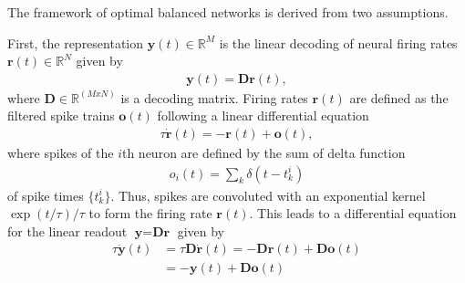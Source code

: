 \documentclass[twoside,twocolumn]{article}
\renewcommand{\b}[1]{\textbf{#1}}
\newcommand{\R}{\mathbb{R}}
\begin{document}
The framework of optimal balanced networks \cite{Deneve2016, Boerlin2013} is derived from two assumptions. 

First, the representation $\b{y}(t) \in \R^M$ is the linear decoding of neural firing rates $\b{r}(t) \in \R^N$ given by
\begin{align}
\b{y}(t) = \b{D} \b{r}(t),
\end{align}
where $\b{D} \in \R^{(MxN)}$ is a decoding matrix. Firing rates $\b{r}(t)$ are defined as the filtered spike trains $\b{o}(t)$ following a linear differential equation
\begin{align}
\tau\dot{\b{r}}(t) = -\b{r}(t) + \b{o}(t),
\end{align}
where spikes of the $i$th neuron are defined by the sum of delta function
\begin{align}
o_i(t) = \sum_k \delta(t-t_k^i)
\end{align}
of spike times $\{t_k^i\}$. Thus, spikes are convoluted with an exponential kernel $\exp(t/\tau)/\tau$ to form the firing rate $\b{r}(t)$. This leads to a differential equation for the linear readout $\b{y}=\b{D}\b{r}$ given by
\begin{align}
\tau \dot{\b{y}}(t) &= \tau \b{D}\dot{\b{r}}(t) = -\b{D}\b{r}(t) + \b{D}\b{o}(t) \\ &= -\b{y}(t) + \b{D}\b{o}(t)
\end{align}
\end{document}
